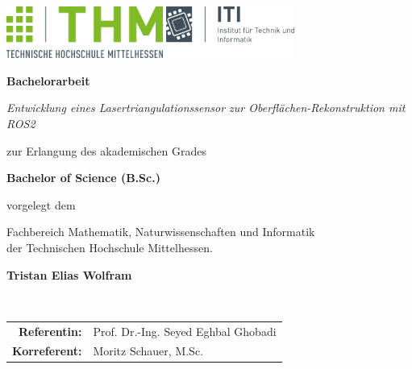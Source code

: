 \thispagestyle{empty}
\begin{center}
	\includegraphics[height=1.7cm]{img/thm-logo/thm1.png}
	\hfill
	\includegraphics[height=1.7cm]{img/iti-logo/iti_2020_whitespace.png}\\
	
	\vfill
	
	\Huge
	\textbf{Bachelorarbeit}\\ %
		
	\vfill
	
	\Huge
	\textit{Entwicklung eines Lasertriangulationssensor zur Oberflächen-Rekonstruktion mit ROS2}\\
	
	\vfill
	
	\large	
	zur Erlangung des akademischen Grades  \\
	
	\vfill
	
	\textbf{Bachelor of Science (B.Sc.)}\\ %
	
	\vfill
	
	vorgelegt dem  \\
	
	\vfill
	
	Fachbereich Mathematik, Naturwissenschaften und Informatik \\	
	der Technischen Hochschule Mittelhessen. \\
	
	\vfill
	
	\textbf{Tristan Elias Wolfram}\\
	
	\vfill
	
	\normalsize
	\\
	
	\vfill

	\begin{tabular}{rl}
		\rule{0mm}{2ex}\textbf{Referentin:}    	& Prof. Dr.-Ing. Seyed Eghbal Ghobadi\\ 
		\rule{0mm}{2ex}\textbf{Korreferent:} 	& Moritz Schauer, M.Sc. \\ 
	\end{tabular} 
\end{center}